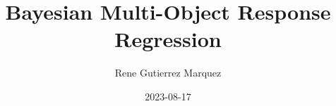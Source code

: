 \documentclass[
]{article}
\title{Bayesian Multi-Object Response Regression}
\author{Rene Gutierrez Marquez}
\date{2023-08-17}
\begin{document}
\maketitle

{
\setcounter{tocdepth}{2}
\tableofcontents
}
\newcommand{\ba}{ {\boldsymbol a} }
\newcommand{\bA}{ {\boldsymbol A} }
\newcommand{\bb}{ {\boldsymbol b} }
\newcommand{\bB}{ {\boldsymbol B} }
\newcommand{\bc}{ {\boldsymbol c} }
\newcommand{\bC}{ {\boldsymbol C} }
\newcommand{\bd}{ {\boldsymbol d} }
\newcommand{\bD}{ {\boldsymbol D} }
\newcommand{\be}{ {\boldsymbol e} }
\newcommand{\bE}{ {\boldsymbol E} }
\newcommand{\boldf}{ {\boldsymbol f} }
\newcommand{\bF}{ {\boldsymbol F} }
\newcommand{\bg}{ {\boldsymbol g} }
\newcommand{\bG}{ {\boldsymbol G} }
\newcommand{\bh}{ {\boldsymbol h} }
\newcommand{\bH}{ {\boldsymbol H} }
\newcommand{\bi}{ {\boldsymbol i} }
\newcommand{\bI}{ {\boldsymbol I} }
\newcommand{\bj}{ {\boldsymbol j} }
\newcommand{\bJ}{ {\boldsymbol J} }
\newcommand{\bk}{ {\boldsymbol k} }
\newcommand{\bK}{ {\boldsymbol K} }
\newcommand{\bl}{ {\boldsymbol l} }
\newcommand{\bL}{ {\boldsymbol L} }
\newcommand{\bm}{ {\boldsymbol m} }
\newcommand{\bM}{ {\boldsymbol M} }
\newcommand{\bn}{ {\boldsymbol n} }
\newcommand{\bN}{ {\boldsymbol N} }
\newcommand{\bo}{ {\boldsymbol o} }
\newcommand{\bO}{ {\boldsymbol O} }
\newcommand{\bp}{ {\boldsymbol p} }
\newcommand{\bP}{ {\boldsymbol P} }
\newcommand{\bq}{ {\boldsymbol q} }
\newcommand{\bQ}{ {\boldsymbol Q} }
\newcommand{\br}{ {\boldsymbol r} }
\newcommand{\bR}{ {\boldsymbol R} }
\newcommand{\bs}{ {\boldsymbol s} }
\newcommand{\bS}{ {\boldsymbol S} }
\newcommand{\bt}{ {\boldsymbol t} }
\newcommand{\bT}{ {\boldsymbol T} }
\newcommand{\bu}{ {\boldsymbol u} }
\newcommand{\bU}{ {\boldsymbol U} }
\newcommand{\bv}{ {\boldsymbol v} }
\newcommand{\bV}{ {\boldsymbol V} }
\newcommand{\bw}{ {\boldsymbol w} }
\newcommand{\bW}{ {\boldsymbol W} }
\newcommand{\bx}{ {\boldsymbol x} }
\newcommand{\bX}{ {\boldsymbol X} }
\newcommand{\by}{ {\boldsymbol y} }
\newcommand{\bY}{ {\boldsymbol Y} }
\newcommand{\bz}{ {\boldsymbol z} }
\newcommand{\bZ}{ {\boldsymbol Z} }
\end{document}
